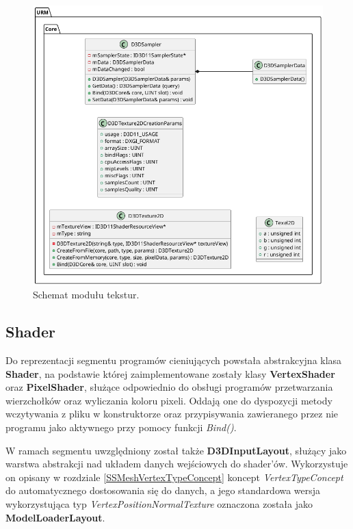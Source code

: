 	\begin{figure}[h!]
		\centering
		\includegraphics[width=\textwidth]{images/UML/texture.png}
		\caption{Schemat modułu tekstur.}
		\label{UML_Textures}
	\end{figure}
	
\subsection{Shader}
	Do reprezentacji segmentu programów cieniujących powstała abstrakcyjna klasa \textbf{Shader}, na podstawie której zaimplementowane zostały klasy \textbf{VertexShader} oraz \textbf{PixelShader}, służące odpowiednio do obsługi programów przetwarzania wierzchołków oraz wyliczania koloru pixeli. Oddają one do dyspozycji metody wczytywania z pliku w konstruktorze oraz przypisywania zawieranego przez nie programu jako aktywnego przy pomocy funkcji \textit{Bind()}.
	
	W ramach segmentu uwzględniony został także \textbf{D3DInputLayout}, służący jako warstwa abstrakcji nad układem danych wejściowych do shader'ów. Wykorzystuje on opisany w rozdziale \ref{SSMeshVertexTypeConcept} koncept \textit{VertexTypeConcept} do automatycznego dostosowania się do danych, a jego standardowa wersja wykorzystująca typ \textit{VertexPositionNormalTexture} oznaczona została jako \textbf{ModelLoaderLayout}.
	
